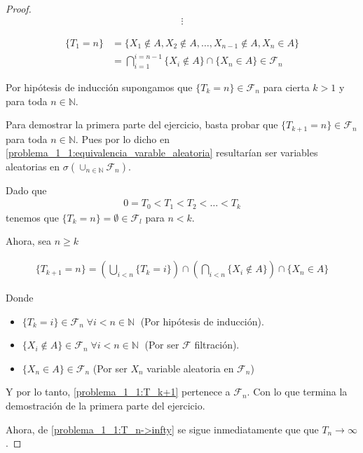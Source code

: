 \begin{proof}
	\begin{align}
		\vdots
	\end{align}
	
	\begin{align}
			\{T_1 = n\} 	&=	\{ X_1 \not\in A, X_2 \not\in A, \dots, X_{n-1} \not\in A, X_n \in A \} \\
							&= 	\bigcap_{i=1}^{i=n-1} \{ X_i \not\in A \} \cap \{X_n \in A \} \in \mathscr{F}_n
	\end{align}\par\null
 
	Por hipótesis de inducción supongamos que $\{T_k = n\} \in \mathscr{F}_n$ para cierta $k>1$ 
	y para toda $n \in \mathbb{N}$.\par\null

	Para demostrar la primera parte del ejercicio, basta probar que $\{T_{k+1} = n\} \in \mathscr{F}_n$ para 
	toda $n \in \mathbb{N}$. Pues por lo dicho en \eqref{problema_1_1:equivalencia_varable_aleatoria} resultarían ser 
	variables aleatorias en $\sigma(\cup_{n \in \mathbb{N}} \mathscr{F}_n)$.\par\null
	
	Dado que 
	\begin{align}\label{problema_1_1:T_n->infty}
		0=T_0<T_1<T_2<\dots<T_k
	\end{align}  
	tenemos que $\{ T_k = n\} = \emptyset \in \mathscr{F}_l$ para $n < k$.\par\null
	
	Ahora, sea $n \geq k$
	
	\begin{align}\label{problema_1_1:T_k+1}
		\{ T_{k+1} = n\} = 
		\left( \bigcup_{i < n } \{T_k = i \} \right) 
		\cap 
		\left( \bigcap_{i < n} \{ X_i \not\in A \} \right)
		\cap
		\{ X_n \in A\}
	\end{align}
	
	
	Donde 
	\begin{itemize}
		\item	 $\{ T_k = i\} \in \mathscr{F}_n \; \forall i < n \in \mathbb{N} \; $ (Por hipótesis de inducción).	
		\item	 $\{ X_i \not \in A\} \in \mathscr{F}_n \; \forall i < n \in \mathbb{N} \;$ (Por ser $\mathscr{F}$ filtración).
		\item $\{ X_n \in A\} \in \mathscr{F}_n$ (Por ser $X_n$ variable aleatoria en $\mathscr{F}_n$)	
	\end{itemize}
	
	Y por lo tanto, \eqref{problema_1_1:T_k+1} pertenece a $\mathscr{F}_n$. Con lo que termina la demostración de la primera parte del ejercicio.\par\null
	
	Ahora, de \eqref{problema_1_1:T_n->infty} se sigue inmediatamente que que $T_n \rightarrow \infty$.
\end{proof}